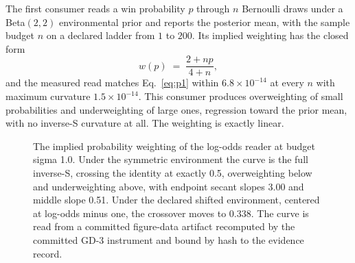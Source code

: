 \documentclass[aps,pre,reprint,nofootinbib]{revtex4-2}
\begin{document}
The first consumer reads a win probability $p$ through $n$ Bernoulli
draws under a Beta$(2,2)$ environmental prior and reports the
posterior mean, with the sample budget $n$ on a declared ladder from
$1$ to $200$.  Its implied weighting has the closed form
\begin{equation}
  w(p) \;=\; \frac{2 + np}{4 + n},
  \label{eq:p1}
\end{equation}
and the measured read matches Eq.~\eqref{eq:p1} within
$6.8\times10^{-14}$ at every $n$ with maximum curvature
$1.5\times10^{-14}$.  This consumer produces overweighting of small
probabilities and underweighting of large ones, regression toward
the prior mean, with no inverse-S curvature at all.  The weighting
is exactly linear.

\begin{figure}[t]
\centering
{}
\caption{The implied probability weighting of the log-odds reader at
budget sigma 1.0.  Under the symmetric environment the curve is the
full inverse-S, crossing the identity at exactly 0.5, overweighting
below and underweighting above, with endpoint secant slopes 3.00 and
middle slope 0.51.  Under the declared shifted environment, centered
at log-odds minus one, the crossover moves to 0.338.  The curve is
read from a committed figure-data artifact recomputed by the
committed GD-3 instrument and bound by hash to the evidence
record.}
\label{fig:gd3}
\end{figure}
\end{document}
